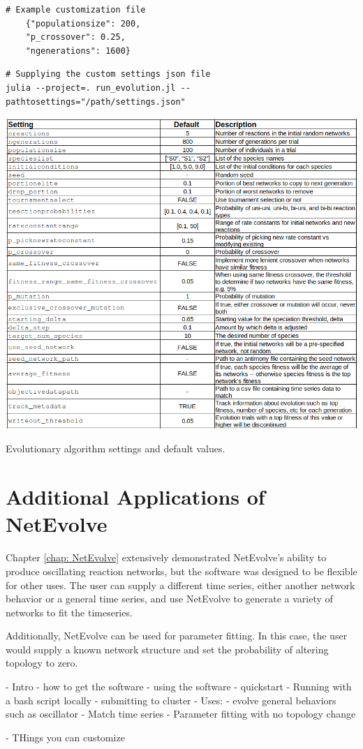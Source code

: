 \documentclass[12pt]{report}
\begin{document}
\begin{Verbatim}[frame=single]
	# Example customization file
	{"populationsize": 200,
	"p_crossover": 0.25,
	"ngenerations": 1600}
\end{Verbatim}

\begin{Verbatim}[frame=single]
# Supplying the custom settings json file
julia --project=. run_evolution.jl --pathtosettings="/path/settings.json"
\end{Verbatim}


\begin{table}

    \includegraphics[width=18cm]{images/hyperparams.png}
    \caption[Evolution algorithm settings]{Evolutionary algorithm settings and default values.}
    \label{table:hyperparams}
\end{table}

\section{Additional Applications of NetEvolve}
Chapter \ref{chap: NetEvolve} extensively demonstrated NetEvolve's ability to produce oscillating reaction networks, but the software was designed to be flexible for other uses. The user can supply a different time series, either another network behavior or a general time series, and use NetEvolve to generate a variety of networks to fit the timeseries.

Additionally, NetEvolve can be used for parameter fitting. In this case, the user would supply a known network structure and set the probability of altering topology to zero. 

- Intro
- how to get the software
- using the software
	- quickstart
	- Running with a bash script locally
	- submitting to cluster
- Uses:
	- evolve general behaviors such as oscillator
	- Match time series
	- Parameter fitting with no topology change
	
- THings you can customize



\end{document}
